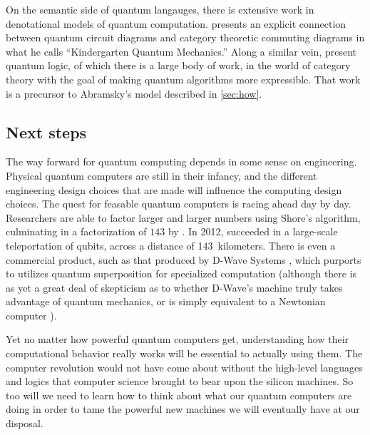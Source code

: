 On the semantic side of quantum langauges, there is extensive work in denotational 
models of quantum computation. \citet{coecke2005kindergarten} presents an
explicit connection between quantum circuit diagrams and category theoretic 
commuting diagrams in what he calls ``Kindergarten Quantum Mechanics.''
Along a similar vein, \citet{abramsky2006categorical} present quantum logic,
of which there is a large body of work, in the world of category theory with
the goal of making quantum algorithms more expressible. That work is a precursor
to Abramsky's model described in \cref{sec:how}.

\subsection{Next steps}

The way forward for quantum computing depends in some sense on engineering.
Physical quantum computers are still in their infancy, and the different
engineering design choices that are made will influence the computing design
choices.  The quest for feasable quantum computers is racing ahead day by day.
Researchers are able to factor larger and larger numbers using Shore's
algorithm, culminating in a factorization of $143$ by \citet{xu2012quantum}.  In
2012, \citet{ma2012quantum} succeeded in a large-scale teleportation of qubits,
across a distance of 143~kilometers.  There is even a commercial product, such
as that produced by D-Wave Systems \citep{johnson2011quantum}, which purports to
utilizes quantum superposition for specialized computation (although there is as
yet a great deal of skepticism as to whether D-Wave's machine truly takes
advantage of quantum mechanics, or is simply equivalent to a Newtonian
computer \citep{aaronson2014TIME}).

Yet no matter how powerful quantum computers get, understanding how their
computational behavior really works will be essential to actually using them.
The computer revolution would not have come about without the high-level
languages and logics that computer science brought to bear upon the silicon
machines.  So too will we need to learn how to think about what our quantum
computers are doing in order to tame the powerful new machines we will
eventually have at our disposal.
